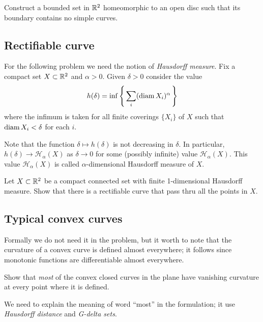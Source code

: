 \label{Crooked circle}

\begin{pr}
Construct 
a bounded set in $\mathbb{R}^2$
homeomorphic to an open disc
such that 
its boundary contains no simple curves.
\end{pr}

\subsection*{Rectifiable curve}
\label{Rectifiable curve}

For the following problem we need the notion of 
\emph{Hausdorff measure}.
Fix a compact set $X\subset\mathbb{R}^2$ and $\alpha>0$.
Given $\delta>0$ consider the value
\[h(\delta)=\inf\left\{\,\sum_i(\operatorname{\rm diam}\nolimits X_i)^\alpha\,\right\}\]
where the infimum is taken for all finite coverings $\{X_i\}$ of $X$ 
such that $\operatorname{\rm diam}\nolimits X_i<\delta$ for each $i$.

Note that the function $\delta\mapsto h(\delta)$ is not decreasing in $\delta$.
In particular, $h(\delta)\to \mathcal{H}_\alpha(X)$ as $\delta\to 0$ for some (possibly infinite) value $\mathcal{H}_\alpha(X)$.
This value $\mathcal{H}_\alpha(X)$ is called $\alpha$-dimensional Hausdorff measure of $X$.

\begin{pr}
Let $X\subset \mathbb{R}^2$ be a compact connected set
with finite 1-dimensional Hausdorff measure. 
Show that there is a rectifiable curve that pass thru all the points in $X$.
\end{pr}

\subsection*{Typical convex curves}

Formally we do not need it in the problem, 
but it worth to note that the curvature of a convex curve is defined almost everywhere;
it follows since monotonic functions are differentiable almost everywhere.

\begin{pr}
Show that \emph{most} of the convex closed curves in the plane
have vanishing curvature at every point where it is defined.
\end{pr}

We need to explain the meaning of word ``most'' in the formulation;
it use \emph{Hausdorff distance} and \emph{G-delta sets}.

